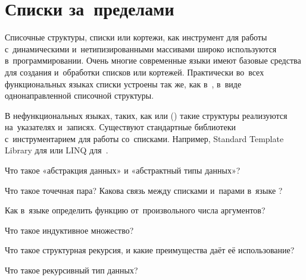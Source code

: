 \section{Списки за~пределами~\Scheme}%
Списочные структуры, списки или кортежи, как инструмент для работы с~динамическими и~нетипизированными массивами широко используются в~программировании. Очень многие современные языки имеют базовые средства для создания и~обработки списков или кортежей. Практически во~всех функциональных языках списки устроены так же, как в~\Scheme, в~виде однонаправленной списочной структуры.

В нефункциональных языках, таких, как  или  () такие структуры реализуются на~указателях и~записях. Существуют стандартные библиотеки с~инструментарием для работы со~списками. Например, Standard Template Library для  или LINQ для~.

\newpage
\begin{Queeze}

 \item Что такое «абстракция данных» и «абстрактный типы данных»?

 \item Что такое точечная пара? Какова связь между списками и~парами в~языке \Scheme?

 \item Как в~языке \Scheme определить функцию от~произвольного числа аргументов?

 \item Что такое индуктивное множество?

 \item Что такое структурная рекурсия, и какие преимущества даёт её использование?
 
 \item Что такое рекурсивный тип данных?

\end{Queeze}
\endinput